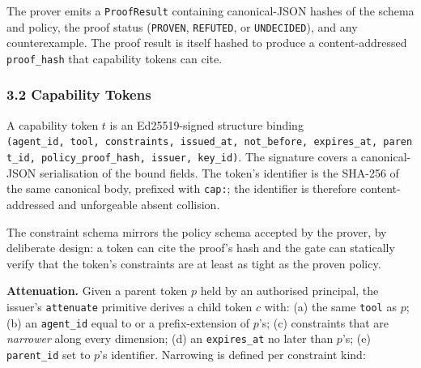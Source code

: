 The prover emits a \texttt{ProofResult} containing canonical-JSON hashes
of the schema and policy, the proof status (\texttt{PROVEN},
\texttt{REFUTED}, or \texttt{UNDECIDED}), and any counterexample. The
proof result is itself hashed to produce a content-addressed
\texttt{proof\_hash} that capability tokens can cite.

\subsubsection{3.2 Capability Tokens}\label{capability-tokens}

A capability token \(t\) is an Ed25519-signed structure binding
\texttt{(agent\_id,\ tool,\ constraints,\ issued\_at,\ not\_before,\ expires\_at,\ parent\_id,\ policy\_proof\_hash,\ issuer,\ key\_id)}.
The signature covers a canonical-JSON serialisation of the bound fields.
The token's identifier is the SHA-256 of the same canonical body,
prefixed with \texttt{cap:}; the identifier is therefore
content-addressed and unforgeable absent collision.

The constraint schema mirrors the policy schema accepted by the prover,
by deliberate design: a token can cite the proof's hash and the gate can
statically verify that the token's constraints are at least as tight as
the proven policy.

\textbf{Attenuation.} Given a parent token \(p\) held by an authorised
principal, the issuer's \texttt{attenuate} primitive derives a child
token \(c\) with: (a) the same \texttt{tool} as \(p\); (b) an
\texttt{agent\_id} equal to or a prefix-extension of \(p\)'s; (c)
constraints that are \emph{narrower} along every dimension; (d) an
\texttt{expires\_at} no later than \(p\)'s; (e) \texttt{parent\_id} set
to \(p\)'s identifier. Narrowing is defined per constraint kind:

